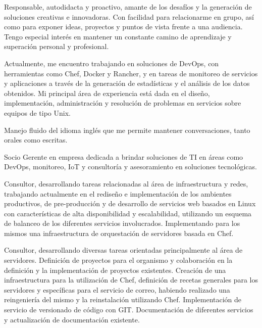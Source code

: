 


\begin{cv}


Responsable, autodidacta y proactivo, amante de los desafíos y la generación de soluciones
creativas e innovadoras. Con facilidad para relacionarme en grupo, así como para exponer
ideas, proyectos y puntos de vista frente a una audiencia. Tengo especial interés en
mantener un constante camino de aprendizaje y superación personal y profesional.

Actualmente, me encuentro trabajando en soluciones de DevOps, con herramientas como Chef,
Docker y Rancher, y en tareas de monitoreo de servicios y aplicaciones a través de la
generación de estadísticas y el análisis de los datos obtenidos. Mi principal área de
experiencia está dada en el diseño, implementación, administración y resolución de
problemas en servicios sobre equipos de tipo Unix.

Manejo fluido del idioma inglés que me permite mantener conversaciones, tanto orales como
escritas.



Socio Gerente en empresa dedicada a brindar soluciones de TI en áreas como DevOps,
monitoreo, IoT y consultoría y asesoramiento en soluciones tecnológicas.


Consultor, desarrollando tareas relacionadas al área de infraestructura y redes,
trabajando actualmente en el rediseño e implementación de los ambientes productivos, de
pre-producción y de desarrollo de servicios web basados en Linux con características de
alta disponibilidad y escalabilidad, utilizando un esquema de balanceo de los diferentes
servicios involucrados. Implementando para los mismos una infraestructura de orquestación
de servidores basada en Chef.


Consultor, desarrollando diversas tareas orientadas principalmente al área de servidores.
Definición de proyectos para el organismo y colaboración en la definición y la
implementación de proyectos existentes. Creación de una infraestructura para la
utilización de Chef, definición de recetas generales para los servidores y específicas
para el servicio de correo, habiendo realizado una reingeniería del mismo y la
reinstalación utilizando Chef. Implementación de servicio de versionado de código con GIT.
Documentación de diferentes servicios y actualización de documentación existente.


\end{cv}
